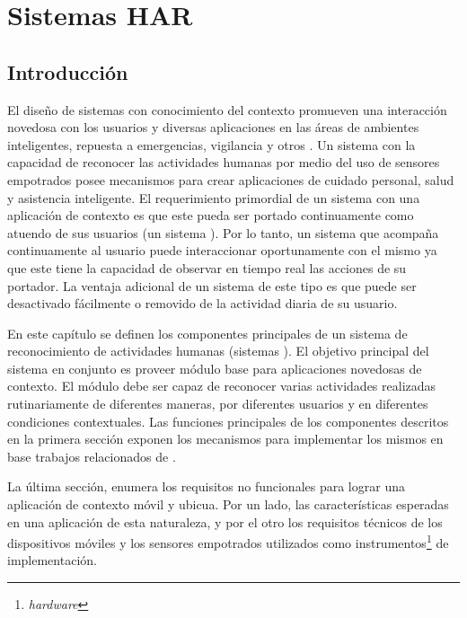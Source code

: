 
\chapter{Sistemas HAR }

\label{chap4:sistemas-de-reconocimiento}

\section{Introducción}

\label{sec41:introduccion}El diseño de sistemas con conocimiento
del contexto promueven una interacción novedosa con los usuarios y
diversas aplicaciones en las áreas de ambientes inteligentes, repuesta
a emergencias, vigilancia y otros \cite{Choudhury2008}. Un sistema
con la capacidad de reconocer las actividades humanas por medio del
uso de sensores empotrados posee mecanismos para crear aplicaciones
de cuidado personal, salud y asistencia inteligente. El requerimiento
primordial de un sistema con una aplicación de contexto es que este
pueda ser portado continuamente como atuendo de sus usuarios (un sistema
). Por lo tanto, un sistema que acompaña continuamente
al usuario puede interaccionar oportunamente con el mismo ya que este
tiene la capacidad de observar en tiempo real las acciones de su portador.
La ventaja adicional de un sistema de este tipo es que puede ser desactivado
fácilmente o removido de la actividad diaria de su usuario.

En este capítulo se definen los componentes principales de un sistema
de reconocimiento de actividades humanas (sistemas ). El
objetivo principal del sistema en conjunto es proveer módulo
base para aplicaciones novedosas de contexto. El módulo debe ser capaz
de reconocer varias actividades realizadas rutinariamente de diferentes
maneras, por diferentes usuarios y en diferentes condiciones contextuales.
Las funciones principales de los componentes descritos en la primera
sección exponen los mecanismos para implementar los mismos en base
trabajos relacionados de  \cite{Choudhury2008,ReyesOrtiz2015}. 

La última sección, enumera los requisitos no funcionales para lograr
una aplicación de contexto móvil y ubicua. Por un lado, las características
esperadas en una aplicación de esta naturaleza, y por el otro los
requisitos técnicos de los dispositivos móviles y los sensores empotrados
utilizados como instrumentos\footnote{\emph{hardware}} de implementación.


